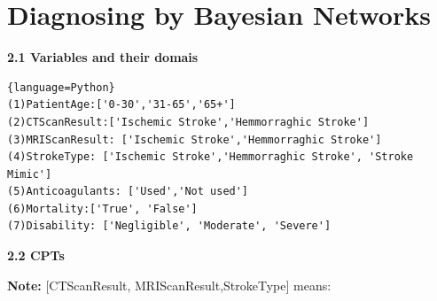 \documentclass[a4paper, 11pt]{article}
\begin{document}
\section{Diagnosing by Bayesian Networks}
\textbf{2.1 Variables and their domais}
\begin{lstlisting}{language=Python}
(1)PatientAge:['0-30','31-65','65+']
(2)CTScanResult:['Ischemic Stroke','Hemmorraghic Stroke']
(3)MRIScanResult: ['Ischemic Stroke','Hemmorraghic Stroke']
(4)StrokeType: ['Ischemic Stroke','Hemmorraghic Stroke', 'Stroke Mimic']
(5)Anticoagulants: ['Used','Not used']
(6)Mortality:['True', 'False']
(7)Disability: ['Negligible', 'Moderate', 'Severe']
\end{lstlisting}
\textbf{2.2 CPTs}

\textbf{Note:} [CTScanResult, MRIScanResult,StrokeType] means:
\end{document}
